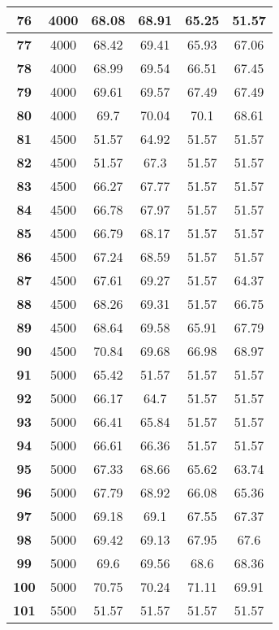 \begin{longtable}{|c|c|c|c|c|c|}
\textbf{76} & 4000 & 68.08 & 68.91 & 65.25 & 51.57 \\ \hline 
\textbf{77} & 4000 & 68.42 & 69.41 & 65.93 & 67.06 \\ \hline 
\textbf{78} & 4000 & 68.99 & 69.54 & 66.51 & 67.45 \\ \hline 
\textbf{79} & 4000 & 69.61 & 69.57 & 67.49 & 67.49 \\ \hline 
\textbf{80} & 4000 & 69.7 & 70.04 & 70.1 & 68.61 \\ \hline 
\textbf{81} & 4500 & 51.57 & 64.92 & 51.57 & 51.57 \\ \hline 
\textbf{82} & 4500 & 51.57 & 67.3 & 51.57 & 51.57 \\ \hline 
\textbf{83} & 4500 & 66.27 & 67.77 & 51.57 & 51.57 \\ \hline 
\textbf{84} & 4500 & 66.78 & 67.97 & 51.57 & 51.57 \\ \hline 
\textbf{85} & 4500 & 66.79 & 68.17 & 51.57 & 51.57 \\ \hline 
\textbf{86} & 4500 & 67.24 & 68.59 & 51.57 & 51.57 \\ \hline 
\textbf{87} & 4500 & 67.61 & 69.27 & 51.57 & 64.37 \\ \hline 
\textbf{88} & 4500 & 68.26 & 69.31 & 51.57 & 66.75 \\ \hline 
\textbf{89} & 4500 & 68.64 & 69.58 & 65.91 & 67.79 \\ \hline 
\textbf{90} & 4500 & 70.84 & 69.68 & 66.98 & 68.97 \\ \hline 
\textbf{91} & 5000 & 65.42 & 51.57 & 51.57 & 51.57 \\ \hline 
\textbf{92} & 5000 & 66.17 & 64.7 & 51.57 & 51.57 \\ \hline 
\textbf{93} & 5000 & 66.41 & 65.84 & 51.57 & 51.57 \\ \hline 
\textbf{94} & 5000 & 66.61 & 66.36 & 51.57 & 51.57 \\ \hline 
\textbf{95} & 5000 & 67.33 & 68.66 & 65.62 & 63.74 \\ \hline 
\textbf{96} & 5000 & 67.79 & 68.92 & 66.08 & 65.36 \\ \hline 
\textbf{97} & 5000 & 69.18 & 69.1 & 67.55 & 67.37 \\ \hline 
\textbf{98} & 5000 & 69.42 & 69.13 & 67.95 & 67.6 \\ \hline 
\textbf{99} & 5000 & 69.6 & 69.56 & 68.6 & 68.36 \\ \hline 
\textbf{100} & 5000 & 70.75 & 70.24 & 71.11 & 69.91 \\ \hline 
\textbf{101} & 5500 & 51.57 & 51.57 & 51.57 & 51.57 \\ \hline 

\end{longtable}
